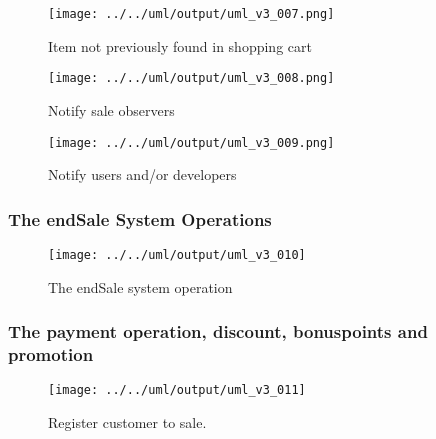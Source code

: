 \documentclass[a4paper]{scrreprt}
\begin{document}
\begin{figure}[H]
    \begin{center}
        \texttt{[image: ../../uml/output/uml\_v3\_007.png]}
        \caption{Item not previously found in shopping cart}
        \label{fig:item-not-in-shopping-cart}
    \end{center}
\end{figure}

\begin{figure}[H]
    \begin{center}
        \texttt{[image: ../../uml/output/uml\_v3\_008.png]}
        \caption{Notify sale observers}
        \label{fig:notify-sale-observers}
    \end{center}
\end{figure}

\begin{figure}[H]
    \begin{center}
        \texttt{[image: ../../uml/output/uml\_v3\_009.png]}
        \caption{Notify users and/or developers}
        \label{fig:notify-users-developers}
    \end{center}
\end{figure}

\subsubsection*{The endSale System Operations}
\begin{figure}[H]
    \begin{center}
        \texttt{[image: ../../uml/output/uml\_v3\_010]}
        \caption{The endSale system operation}
        \label{fig:end-sale}
    \end{center}
\end{figure}
%
\subsubsection*{The payment operation, discount, bonuspoints and promotion}
\begin{figure}[H]
    \begin{center}
        \texttt{[image: ../../uml/output/uml\_v3\_011]}
        \caption{Register customer to sale.}
        \label{fig:reg-customer}
    \end{center}
\end{figure}
\end{document}
